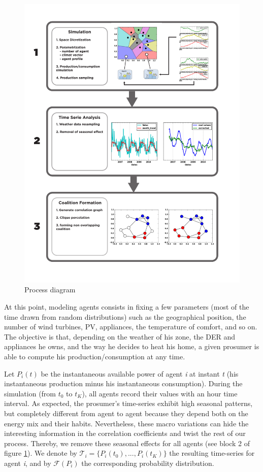 \documentclass[conference]{IEEEtran}
\begin{document}
\begin{center}
\begin{figure}
\includegraphics[scale=0.51]{figure2/Fig2}
\caption{Process diagram}
\label{Fig1}
\end{figure}
\end{center}

At this point, modeling agents consists in fixing a few parameters (most of the time drawn from random distributions) such as the geographical position, the number of wind turbines, PV, appliances, the temperature of comfort, and so on. The objective is that, depending on the weather of his zone, the DER and appliances he owns, and the way he decides to heat his home, a given prosumer is able to compute his production/consumption at any time. 

Let $ P_{i}(t) $ be the instantaneous available power of agent \textit{i} at instant \textit{t} (his instantaneous production minus his instantaneous consumption). During the simulation (from $t_{0} $ to $ t_{K} $), all agents record their values with an hour time interval. As expected, the prosumer's time-series exhibit high seasonal patterns, but completely different from agent to agent because they depend both on the energy mix and their habits. Nevertheless, these macro variations can hide the interesting information in the correlation coefficients and twist the rest of our process. Thereby, we remove these seasonal effects for all agents (see block 2 of figure \ref{Fig1}). We denote by $ \mathcal{T}_{i} = \{ P_{i}(t_{0}),...,P_{i}(t_{K}) \} $ the resulting time-series for  agent \textit{i}, and by $ \mathcal{F}(P_{i}) $ the corresponding probability distribution.
\end{document}
